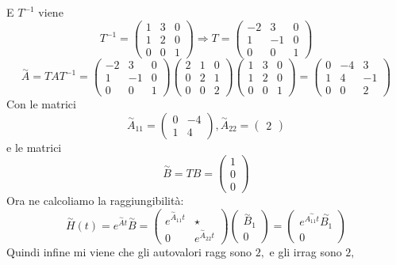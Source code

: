 \documentclass{article}
\begin{document}
E $T^{-1}$ viene \[ T^{-1} = \left(\begin{matrix}1 & 3 & 0\\1 & 2 & 0\\0 & 0 & 1\end{matrix}\right) \Longrightarrow T = \left(\begin{matrix}-2 & 3 & 0\\1 & -1 & 0\\0 & 0 & 1\end{matrix}\right) \]
\[ \overset{\sim}{A} = T A  T^{-1} = \left(\begin{matrix}-2 & 3 & 0\\1 & -1 & 0\\0 & 0 & 1\end{matrix}\right)\left(\begin{matrix}2 & 1 & 0\\0 & 2 & 1\\0 & 0 & 2\end{matrix}\right)\left(\begin{matrix}1 & 3 & 0\\1 & 2 & 0\\0 & 0 & 1\end{matrix}\right) = \left(\begin{matrix}0 & -4 & 3\\1 & 4 & -1\\0 & 0 & 2\end{matrix}\right) \]Con le matrici \[ \overset{\sim}{A}_{11} = \left(\begin{matrix}0 & -4\\1 & 4\end{matrix}\right) , \overset{\sim}{A}_{22} = \left(\begin{matrix}2\end{matrix}\right)  \]e le matrici \[ \overset{\sim}{B} = TB = \left(\begin{matrix}1\\0\\0\end{matrix}\right)  \]
Ora ne calcoliamo la raggiungibilità: \[ \overset{\sim}{H}(t) = e^{\overset{\sim}{A}t}\overset{\sim}{B} = \begin{pmatrix} e^{\overset{\sim}{A}_{11}t} &  \star \\ 0 & e^{\overset{\sim}{A}_{22}t} \end{pmatrix} \begin{pmatrix} \overset{\sim}{B}_1 \\ 0 \end{pmatrix} = \begin{pmatrix} e^{\overset{\sim}{A_{11}t}}\overset{\sim}{B_1} \\ 0 \end{pmatrix} \]
Quindi infine mi viene che gli autovalori ragg sono $ 2,  $ e gli irrag sono $ 2,  $
\end{document}
